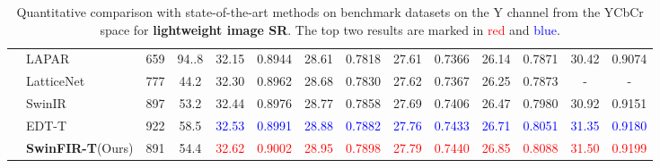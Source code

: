 \documentclass[10pt,twocolumn,letterpaper]{article}
\begin{document}
\begin{table*}[t]
{\begin{tabular}{ c  l  c  c  c  c  c  c  c  c  c  c  c  c }
			\multirow{5}{*}{} & LAPAR & 659 & 94..8 & 32.15 & 0.8944 & 28.61 & 0.7818 & 27.61 & 0.7366 & 26.14 & 0.7871 & 30.42 & 0.9074 \\
			~ & LatticeNet & 777 & 44.2 & 32.30 & 0.8962 & 28.68 & 0.7830 & 27.62 & 0.7367 & 26.25 & 0.7873 & - & - \\
			~ & SwinIR & 897 & 53.2 & 32.44 &0.8976 & 28.77 & 0.7858 & 27.69 & 0.7406 & 26.47 & 0.7980 & 30.92 & 0.9151 \\
~ & EDT-T & 922 & 58.5 & \textcolor{blue}{32.53} & \textcolor{blue}{0.8991} & \textcolor{blue}{28.88} & \textcolor{blue}{0.7882} & \textcolor{blue}{27.76} & \textcolor{blue}{0.7433} & \textcolor{blue}{26.71} & \textcolor{blue}{0.8051} & \textcolor{blue}{31.35} & \textcolor{blue}{0.9180} \\
			~ & \textbf{SwinFIR-T}(Ours) & 891 & 54.4 & \textcolor{red}{32.62} & \textcolor{red}{0.9002} & \textcolor{red}{28.95} & \textcolor{red}{0.7898} & \textcolor{red}{27.79} & \textcolor{red}{0.7440} & \textcolor{red}{26.85} & \textcolor{red}{0.8088} & \textcolor{red}{31.50} & \textcolor{red}{0.9199} \\					
			\hline
		\end{tabular}}
\caption{Quantitative comparison with state-of-the-art methods on benchmark datasets on the Y channel from the YCbCr space for \textbf{lightweight image SR}. The top two results are marked in \textcolor{red}{red} and \textcolor{blue}{blue}.}
		\label{tab:SwinFIR_L_quantitative_results}
\end{table*} 
\end{document}
